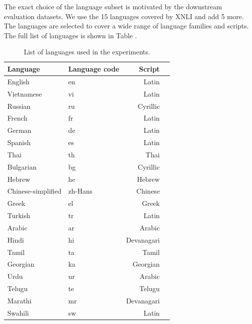The exact choice of the language subset is motivated by the downstream evaluation datasets. We use the 15 languages covered by XNLI and add 5 more. The languages are selected to cover a wide range of language families and scripts. The full list of languages is shown in Table .


\begin{table}
    \centering\footnotesize\sf
    \begin{tabular}{llrl}
    \toprule
    Language & Language code & Script \\
    \midrule
    English & en & Latin \\
    Vietnamese & vi & Latin \\
    Russian & ru & Cyrillic \\
    French & fr & Latin \\
    German & de & Latin \\
    Spanish & es & Latin \\
    Thai & th & Thai \\
    Bulgarian & bg & Cyrillic \\
    Hebrew & he & Hebrew \\
    Chinese-simplified & zh-Hans & Chinese \\
    Greek & el & Greek \\
    Turkish & tr & Latin \\
    Arabic & ar & Arabic \\
    Hindi & hi & Devanagari \\
    Tamil & ta & Tamil \\
    Georgian & ka & Georgian \\
    Urdu & ur & Arabic \\
    Telugu & te & Telugu \\
    Marathi & mr & Devanagari \\
    Swahili & sw & Latin \\
    \bottomrule
    \end{tabular}
    \caption{List of languages used in the experiments.}
    \label{tab:languages}
\end{table}
    


